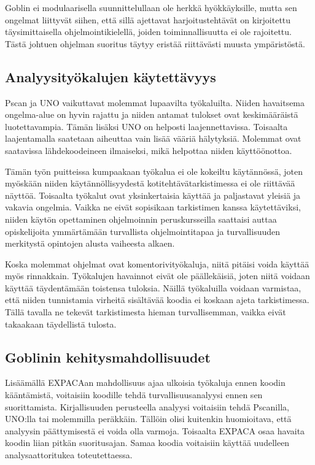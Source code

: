 Goblin ei modulaarisella suunnittelullaan ole herkkä hyökkäyksille, mutta sen
ongelmat liittyvät siihen, että sillä ajettavat harjoitustehtävät on
kirjoitettu täysimittaisella ohjelmointikielellä, joiden toiminnallisuutta ei
ole rajoitettu. Tästä johtuen ohjelman suoritus täytyy eristää riittävästi
muusta ympäristöstä.

\subsection{Analyysityökalujen käytettävyys}

Pscan ja UNO vaikuttavat molemmat lupaavilta työkaluilta. Niiden havaitsema
ongelma-alue on hyvin rajattu ja niiden antamat tulokset ovat keskimääräistä
luotettavampia. Tämän lisäksi UNO on helposti laajennettavissa. Toisaalta
laajentamalla saatetaan aiheuttaa vain lisää vääriä hälytyksiä. Molemmat ovat
saatavissa lähdekoodeineen ilmaiseksi, mikä helpottaa niiden käyttöönottoa.

Tämän työn puitteissa kumpaakaan työkalua ei ole kokeiltu käytännössä, joten
myöskään niiden käytännöllisyydestä kotitehtävätarkistimessa ei ole riittävää
näyttöä. Toisaalta työkalut ovat yksinkertaisia käyttää ja paljastavat yleisiä
ja vakavia ongelmia. Vaikka ne eivät sopisikaan tarkistimen kanssa
käytettäviksi, niiden käytön opettaminen ohjelmoinnin peruskursseilla saattaisi
auttaa opiskelijoita ymmärtämään turvallista ohjelmointitapaa ja turvallisuuden
merkitystä opintojen alusta vaiheesta alkaen.

Koska molemmat ohjelmat ovat komentorivityökaluja, niitä pitäisi voida käyttää
myös rinnakkain. Työkalujen havainnot eivät ole päällekäisiä, joten niitä
voidaan käyttää täydentämään toistensa tuloksia. Näillä työkaluilla voidaan
varmistaa, että niiden tunnistamia virheitä sisältävää koodia ei koskaan ajeta
tarkistimessa. Tällä tavalla ne tekevät tarkistimesta hieman turvallisemman,
vaikka eivät takaakaan täydellistä tulosta.

\subsection{Goblinin kehitysmahdollisuudet}

Lisäämällä EXPACAan mahdollisuus ajaa ulkoisia työkaluja ennen koodin
kääntämistä, voitaisiin koodille tehdä turvallisuusanalyysi ennen sen
suorittamista. Kirjallisuuden perusteella analyysi voitaisiin tehdä Pscanilla,
UNO:lla tai molemmilla peräkkäin. Tällöin olisi kuitenkin huomioitava, että
analyysin päättymisestä ei voida olla varmoja. Toisaalta EXPACA osaa havaita
koodin liian pitkän suoritusajan. Samaa koodia voitaisiin käyttää uudelleen
analysaattoritukea toteutettaessa.

